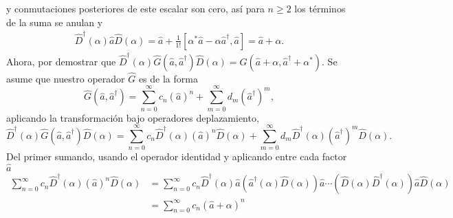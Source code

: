 \begin{enumerate}
\begin{equation}
        \end{equation}
        y conmutaciones posteriores de este escalar son cero, así para $n\geq 2$ los términos de la suma se anulan y
        \begin{align}
          \hat{D}^{\dagger}(\alpha) \hat{a} \hat{D}(\alpha) = \hat{a} + \frac{1}{1!}[\alpha^{*}\hat{a} - \alpha\hat{a}^{\dagger},\hat{a}] = \hat{a} + \alpha.
        \end{align}
        Ahora, por demostrar que $\hat{D}^{\dagger}(\alpha) \hat{G}(\hat{a}, \hat{a}^{\dagger}) \hat{D}(\alpha) = \hat{G}(\hat{a} + \alpha, \hat{a}^{\dagger} + \alpha^{*}) $. Se asume que nuestro operador $\hat{G}$ es de la forma
        \begin{equation}
          \hat{G}(\hat{a}, \hat{a}^{\dagger}) = \sum_{n=0}^{\infty} c_n (\hat{a})^n + \sum_{m=0}^{\infty} d_m (\hat{a}^{\dagger})^{m},
        \end{equation}
        aplicando la transformación bajo operadores deplazamiento,
        \begin{equation}
          \hat{D}^{\dagger}(\alpha)\hat{G}(\hat{a}, \hat{a}^{\dagger})\hat{D}(\alpha) = \sum_{n=0}^{\infty} c_n \hat{D}^{\dagger}(\alpha) (\hat{a})^{n} \hat{D}(\alpha) + \sum_{m=0}^{\infty} d_m \hat{D}^{\dagger}(\alpha) (\hat{a}^{\dagger})^{m} \hat{D}(\alpha) \label{eq:prob3-1}.
        \end{equation}
        Del primer sumando, usando el operador identidad y aplicando entre cada factor $\hat{a}$
        \begin{align}
          \sum_{n=0}^{\infty} c_n \hat{D}^{\dagger}(\alpha) (\hat{a})^{n} \hat{D}(\alpha) & = \sum_{n=0}^{\infty} c_n \hat{D}^{\dagger}(\alpha)\hat{a} \left( \hat{a}^{\dagger}(\alpha)\hat{D}(\alpha)\right)\hat{a} \cdots \left( \hat{D}(\alpha)\hat{D}^{\dagger}(\alpha) \right)\hat{a} \hat{D}(\alpha) \nonumber \\
                                                                                          & = \sum_{n=0}^{\infty} c_n (\hat{a} + \alpha)^n \label{eq:res3-1}
        \end{align}


\end{enumerate}
